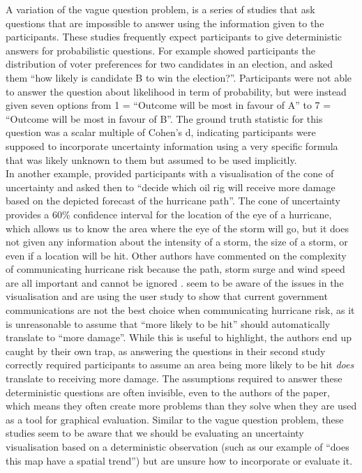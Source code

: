 \documentclass[
  12pt]{article}
\begin{document}
A variation of the vague question problem, is a series of studies that
ask questions that are impossible to answer using the information given
to the participants. These studies frequently expect participants to
give deterministic answers for probabilistic questions. For example
\citet{Correll2014} showed participants the distribution of voter
preferences for two candidates in an election, and asked them ``how
likely is candidate B to win the election?''. Participants were not able
to answer the question about likelihood in term of probability, but were
instead given seven options from 1 = ``Outcome will be most in favour of
A'' to 7 = ``Outcome will be most in favour of B''. The ground truth
statistic for this question was a scalar multiple of Cohen's d,
indicating participants were supposed to incorporate uncertainty
information using a very specific formula that was likely unknown to
them but assumed to be used implicitly.\\
In another example, \citet{Padilla2017} provided participants with a
visualisation of the cone of uncertainty and asked then to ``decide
which oil rig will receive more damage based on the depicted forecast of
the hurricane path''. The cone of uncertainty provides a 60\% confidence
interval for the location of the eye of a hurricane, which allows us to
know the area where the eye of the storm will go, but it does not given
any information about the intensity of a storm, the size of a storm, or
even if a location will be hit. Other authors have commented on the
complexity of communicating hurricane risk because the path, storm surge
and wind speed are all important and cannot be ignored
\citep{Spiegelhalter2017}. \citet{Padilla2017} seem to be aware of the
issues in the visualisation and are using the user study to show that
current government communications are not the best choice when
communicating hurricane risk, as it is unreasonable to assume that
``more likely to be hit'' should automatically translate to ``more
damage''. While this is useful to highlight, the authors end up caught
by their own trap, as answering the questions in their second study
correctly required participants to assume an area being more likely to
be hit \emph{does} translate to receiving more damage. The assumptions
required to answer these deterministic questions are often invisible,
even to the authors of the paper, which means they often create more
problems than they solve when they are used as a tool for graphical
evaluation. Similar to the vague question problem, these studies seem to
be aware that we should be evaluating an uncertainty visualisation based
on a deterministic observation (such as our example of ``does this map
have a spatial trend'') but are unsure how to incorporate or evaluate
it.
\end{document}
